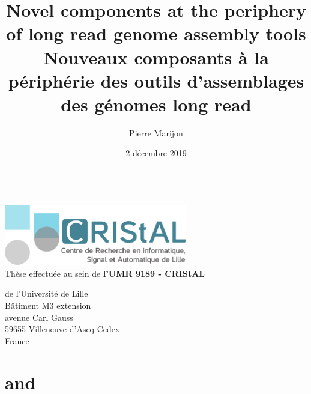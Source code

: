 \documentclass{thesis}
\title{Novel components at the periphery of long read genome assembly tools \\ 
Nouveaux composants à la périphérie des outils d'assemblages des génomes long read} %
\author{Pierre Marijon}
\date{2 décembre 2019}
\begin{document}
\maketitle
\clearpage

\blankpage

\begin{center}
~\vspace*{\fill}\\
\thispagestyle{plain}
\includegraphics[width=0.6\textwidth]{assets/images/logo_cristal}\vspace{0.5cm}\\
Thèse effectuée au sein de \textbf{l'UMR 9189 - CRIStAL}\par 
 de l'Université de Lille\\
Bâtiment M3 extension\\
avenue Carl Gauss\\
59655 Villeneuve d'Ascq Cedex\\
France
\vspace*{\fill}
\clearpage
\end{center}

\frontmatter

\blankpage

\thispagestyle{empty}


\tableofcontents

\mainmatter

\blankpage
















\appendix

\chapter{\knot}


\chapter{\yacrd and \fpa}


\newpage
\thispagestyle{empty}
\backmatter

\end{document}
